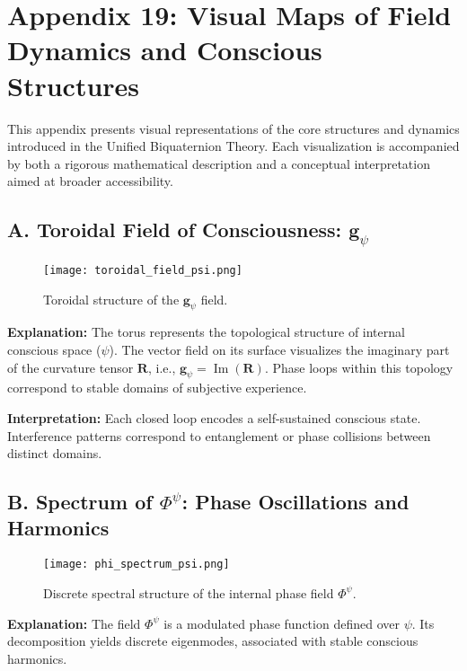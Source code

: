 
\appendix
\section*{Appendix 19: Visual Maps of Field Dynamics and Conscious Structures}

This appendix presents visual representations of the core structures and dynamics introduced in the Unified Biquaternion Theory. Each visualization is accompanied by both a rigorous mathematical description and a conceptual interpretation aimed at broader accessibility.

\subsection*{A. Toroidal Field of Consciousness: \(\mathbf{g}_\psi\)}

\begin{figure}[H]
\centering
\texttt{[image: toroidal\_field\_psi.png]}
\caption{Toroidal structure of the \(\mathbf{g}_\psi\) field.}
\end{figure}

\textbf{Explanation:} The torus represents the topological structure of internal conscious space (\(\psi\)). The vector field on its surface visualizes the imaginary part of the curvature tensor \(\mathbf{R}\), i.e., \(\mathbf{g}_\psi = \operatorname{Im}(\mathbf{R})\). Phase loops within this topology correspond to stable domains of subjective experience.

\textbf{Interpretation:} Each closed loop encodes a self-sustained conscious state. Interference patterns correspond to entanglement or phase collisions between distinct domains.

\subsection*{B. Spectrum of \(\Phi^\psi\): Phase Oscillations and Harmonics}

\begin{figure}[H]
\centering
\texttt{[image: phi\_spectrum\_psi.png]}
\caption{Discrete spectral structure of the internal phase field \(\Phi^\psi\).}
\end{figure}

\textbf{Explanation:} The field \(\Phi^\psi\) is a modulated phase function defined over \(\psi\). Its decomposition yields discrete eigenmodes, associated with stable conscious harmonics.

